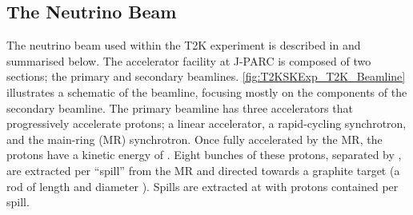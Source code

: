 \subsection{The Neutrino Beam}
\label{subsec:T2KSKExp_T2K_NeutrinoBeam}

The neutrino beam used within the T2K experiment is described in \cite{t2k_det, Abe_2013} and summarised below. The accelerator facility at J-PARC is composed of two sections; the primary and secondary beamlines. \autoref{fig:T2KSKExp_T2K_Beamline} illustrates a schematic of the beamline, focusing mostly on the components of the secondary beamline. The primary beamline has three accelerators that progressively accelerate protons; a linear accelerator, a rapid-cycling synchrotron, and the main-ring (MR) synchrotron. Once fully accelerated by the MR, the protons have a kinetic energy of . Eight bunches of these protons, separated by , are extracted per ``spill'' from the MR and directed towards a graphite target (a rod of length  and diameter ).
Spills are extracted at  with  protons contained per spill.

